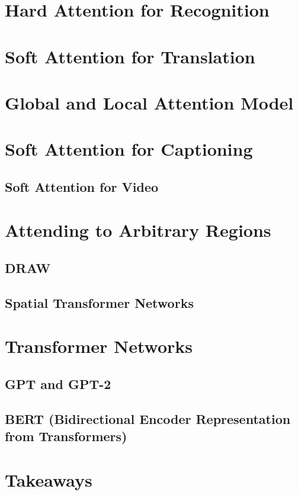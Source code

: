 
	\section{Hard Attention for Recognition} %

	\section{Soft Attention for Translation} %

	\section{Global and Local Attention Model} %

	\section{Soft Attention for Captioning} %

		\subsection{Soft Attention for Video} %

	\section{Attending to Arbitrary Regions} %

		\subsection{DRAW} %

		\subsection{Spatial Transformer Networks} %

	\section{Transformer Networks} %

		\subsection{GPT and GPT-2} %

		\subsection{BERT (Bidirectional Encoder Representation from Transformers)} %

	\section{Takeaways} %
